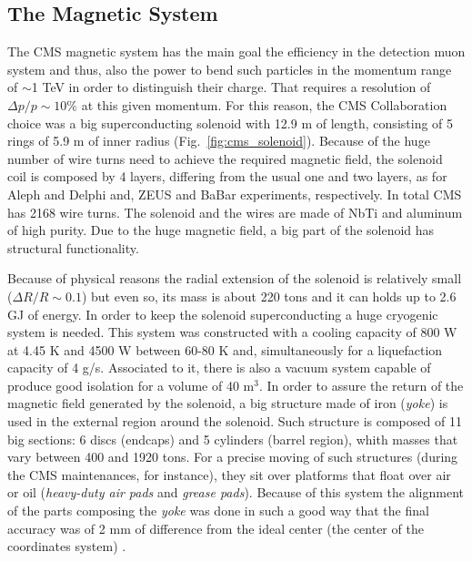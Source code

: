 \subsection{The Magnetic System}
The CMS magnetic system has the main goal the efficiency in the detection muon system and thus, also the power to bend such particles in the momentum range of $\sim$1 TeV in order to distinguish their charge. That requires a resolution of $\Delta p/p \sim10\%$ at this given momentum. For this reason, the CMS Collaboration choice was a big superconducting solenoid with 12.9 m of length, consisting of 5 rings of 5.9 m of inner radius (Fig.~\ref{fig:cms_solenoid}). Because of the huge number of wire turns need to achieve the required magnetic field, the solenoid coil is composed by 4 layers, differing from the usual one and two layers, as for Aleph and Delphi and, ZEUS and BaBar experiments, respectively. In total CMS has 2168 wire turns. The solenoid and the wires are made of NbTi and aluminum of high purity. Due to the huge magnetic field, a big part of the solenoid has structural functionality.

Because of physical reasons the radial extension of the solenoid is relatively small ($\Delta R/R \sim 0.1$) but even so, its mass is about 220 tons and it can holds up to 2.6 GJ of energy. In order to keep the solenoid superconducting a huge cryogenic system is needed. This system was constructed with a cooling capacity of 800 W at 4.45 K and 4500 W between 60-80 K and, simultaneously for a liquefaction capacity of 4 g/s. Associated to it, there is also a vacuum system capable of produce good isolation for a volume of 40 m$^{3}$. In order to assure the return of the magnetic field generated by the solenoid, a big structure made of iron (\textit{yoke}) is used in the external region around the solenoid. Such structure is composed of 11 big sections: 6 discs (endcaps) and 5 cylinders (barrel region), whith masses that vary between 400 and 1920 tons. For a precise moving of such structures (during the CMS maintenances, for instance), they sit over platforms that float over air or oil (\textit{heavy-duty air pads} and \textit{grease pads}). Because of this system the alignment of the parts composing the \textit{yoke} was done in such a good way that the final accuracy was of 2 mm of difference from the ideal center (the center of the coordinates system) \cite{bib:JINST-3-362-2008}.

